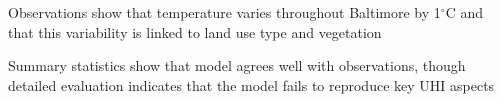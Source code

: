 \documentclass[draft,linenumbers]{agujournal}
\begin{document}





\begin{keypoints}
\item Observations show that temperature varies throughout Baltimore by 1$^\circ$C and that this variability is linked to land use type and vegetation 
\item Summary statistics show that model agrees well with observations, though detailed evaluation indicates that the model fails to reproduce key UHI aspects
\end{keypoints}

%
%

\end{document}
